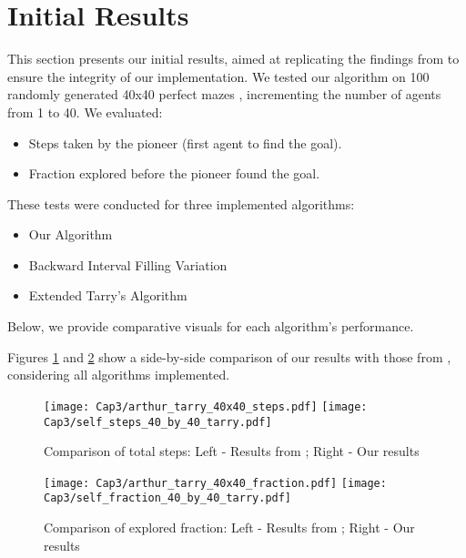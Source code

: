 \section{Initial Results}
\label{section_result_initial_results}

This section presents our initial results,
aimed at replicating the findings from  to ensure the integrity of our implementation.
We tested our algorithm on 100 randomly generated 40x40 perfect mazes \cite{Naeem2021}, incrementing the number of agents from 1 to 40.
We evaluated:

\begin{itemize}
    \item Steps taken by the pioneer (first agent to find the goal).
    \item Fraction explored before the pioneer found the goal.
\end{itemize}

These tests were conducted for three implemented algorithms:

\begin{itemize}
\item Our Algorithm
\item Backward Interval Filling Variation
\item Extended Tarry's Algorithm \cite{Kivelevitch2010}
\end{itemize}

Below, we provide comparative visuals for each algorithm's performance.

Figures \ref{fig_comparison_steps} and \ref{fig_comparison_fraction} show a side-by-side comparison of our results with those from ,
considering all algorithms implemented.

\begin{figure}[H]
\centering
\texttt{[image: Cap3/arthur\_tarry\_40x40\_steps.pdf]}
\texttt{[image: Cap3/self\_steps\_40\_by\_40\_tarry.pdf]}
\caption{Comparison of total steps: Left - Results from ; Right - Our results}
\label{fig_comparison_steps}
\end{figure}

\begin{figure}[H]
    \centering
    \texttt{[image: Cap3/arthur\_tarry\_40x40\_fraction.pdf]}
    \texttt{[image: Cap3/self\_fraction\_40\_by\_40\_tarry.pdf]}
    \caption{Comparison of explored fraction: Left - Results from ; Right - Our results}
\label{fig_comparison_fraction}
\end{figure}


